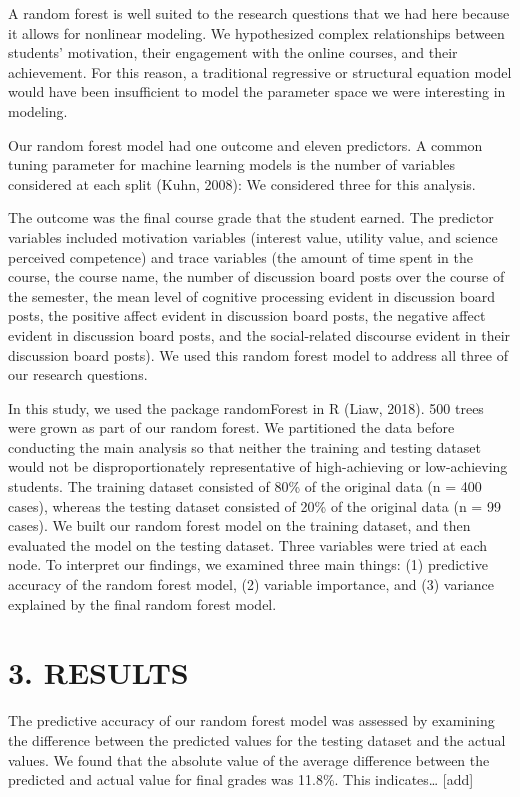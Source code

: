 \documentclass[acmart]{apa6}
\theoremstyle{definition}
\theoremstyle{definition}
\theoremstyle{definition}
\theoremstyle{remark}
\begin{document}
A random forest is well suited to the research questions that we had
here because it allows for nonlinear modeling. We hypothesized complex
relationships between students' motivation, their engagement with the
online courses, and their achievement. For this reason, a traditional
regressive or structural equation model would have been insufficient to
model the parameter space we were interesting in modeling.

Our random forest model had one outcome and eleven predictors. A common
tuning parameter for machine learning models is the number of variables
considered at each split (Kuhn, 2008): We considered three for this
analysis.

The outcome was the final course grade that the student earned. The
predictor variables included motivation variables (interest value,
utility value, and science perceived competence) and trace variables
(the amount of time spent in the course, the course name, the number of
discussion board posts over the course of the semester, the mean level
of cognitive processing evident in discussion board posts, the positive
affect evident in discussion board posts, the negative affect evident in
discussion board posts, and the social-related discourse evident in
their discussion board posts). We used this random forest model to
address all three of our research questions.

In this study, we used the package randomForest in R (Liaw, 2018). 500
trees were grown as part of our random forest. We partitioned the data
before conducting the main analysis so that neither the training and
testing dataset would not be disproportionately representative of
high-achieving or low-achieving students. The training dataset consisted
of 80\% of the original data (n = 400 cases), whereas the testing
dataset consisted of 20\% of the original data (n = 99 cases). We built
our random forest model on the training dataset, and then evaluated the
model on the testing dataset. Three variables were tried at each node.
To interpret our findings, we examined three main things: (1) predictive
accuracy of the random forest model, (2) variable importance, and (3)
variance explained by the final random forest model.

\section{3. RESULTS}\label{results}

The predictive accuracy of our random forest model was assessed by
examining the difference between the predicted values for the testing
dataset and the actual values. We found that the absolute value of the
average difference between the predicted and actual value for final
grades was 11.8\%. This indicates\ldots{} {[}add{]}
\end{document}

